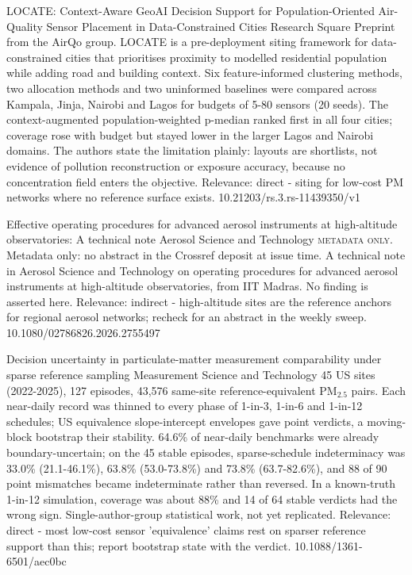 \documentclass[10pt]{article}
\begin{document}
\par{}\baselineskip{}\baselineskip
{}

{LOCATE: Context-Aware GeoAI Decision Support for Population-Oriented Air-Quality Sensor Placement in Data-Constrained Cities}
{Research Square}
{Preprint from the AirQo group. LOCATE is a pre-deployment siting framework for data-constrained cities that prioritises proximity to modelled residential population while adding road and building context. Six feature-informed clustering methods, two allocation methods and two uninformed baselines were compared across Kampala, Jinja, Nairobi and Lagos for budgets of 5-80 sensors (20 seeds). The context-augmented population-weighted p-median ranked first in all four cities; coverage rose with budget but stayed lower in the larger Lagos and Nairobi domains. The authors state the limitation plainly: layouts are shortlists, not evidence of pollution reconstruction or exposure accuracy, because no concentration field enters the objective. Relevance: direct - siting for low-cost PM networks where no reference surface exists.}
{10.21203/rs.3.rs-11439350/v1}

{Effective operating procedures for advanced aerosol instruments at high-altitude observatories: A technical note}
{Aerosol Science and Technology}
{\textsc{metadata only.} Metadata only: no abstract in the Crossref deposit at issue time. A technical note in Aerosol Science and Technology on operating procedures for advanced aerosol instruments at high-altitude observatories, from IIT Madras. No finding is asserted here. Relevance: indirect - high-altitude sites are the reference anchors for regional aerosol networks; recheck for an abstract in the weekly sweep.}
{10.1080/02786826.2026.2755497}

{Decision uncertainty in particulate-matter measurement comparability under sparse reference sampling}
{Measurement Science and Technology}
{45 US sites (2022-2025), 127 episodes, 43,576 same-site reference-equivalent PM$_{2.5}$ pairs. Each near-daily record was thinned to every phase of 1-in-3, 1-in-6 and 1-in-12 schedules; US equivalence slope-intercept envelopes gave point verdicts, a moving-block bootstrap their stability. 64.6\% of near-daily benchmarks were already boundary-uncertain; on the 45 stable episodes, sparse-schedule indeterminacy was 33.0\% (21.1-46.1\%), 63.8\% (53.0-73.8\%) and 73.8\% (63.7-82.6\%), and 88 of 90 point mismatches became indeterminate rather than reversed. In a known-truth 1-in-12 simulation, coverage was about 88\% and 14 of 64 stable verdicts had the wrong sign. Single-author-group statistical work, not yet replicated. Relevance: direct - most low-cost sensor 'equivalence' claims rest on sparser reference support than this; report bootstrap state with the verdict.}
{10.1088/1361-6501/aec0bc}
\end{document}
